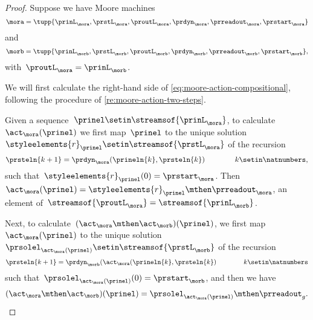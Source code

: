 \begin{proof}
    Suppose we have Moore machines
    \begin{equation}
        \mora = \tupp{\prinL_{\mora},\prstL_{\mora},\proutL_{\mora},\prdyn_{\mora},\prreadout_{\mora},\prstart_{\mora}}
    \end{equation}
    and
    \begin{equation}
        \morb = \tupp{\prinL_{\morb},\prstL_{\morb},\proutL_{\morb},\prdyn_{\morb},\prreadout_{\morb},\prstart_{\morb}},
    \end{equation}
    with~$\proutL_\mora = \prinL_\morb$.

    We will first calculate the right-hand side of \cref{eq:moore-action-compositional}, following the procedure of \cref{re:moore-action-two-steps}.

    Given a sequence~$\prinel \setin \streamsof{\prinL_{\mora}}$, to calculate~$\act_\mora(\prinel)$ we first map~$\prinel$ to the unique solution~$\styleelements{r}_\prinel \setin \streamsof{\prstL_{\mora}}$ of the recursion
    \begin{equation}
        \prsteln{k+1} = \prdyn_\mora(\prineln{k}, \prsteln{k}) \qquad \qquad k \setin \natnumbers,
    \end{equation}
    such that~$\styleelements{r}_\prinel(0) = \prstart_{\mora}$.
    Then~$\act_\mora(\prinel) = \styleelements{r}_\prinel \mthen \prreadout_\mora$, an element of~$\streamsof{\proutL_{\mora}} = \streamsof{\prinL_{\morb}}$.

    Next, to calculate~$(\act_\mora \mthen \act_\morb)(\prinel)$, we first map~$\act_\mora(\prinel)$ to the unique solution~$\prsolel_{\act_\mora(\prinel)} \setin \streamsof{\prstL_{\morb}}$ of the recursion
        \begin{equation}
            \prsteln{k+1} = \prdyn_\morb(\act_\mora(\prineln{k}, \prsteln{k}) \qquad \qquad k \setin \natnumbers
        \end{equation}
        such that~$\prsolel_{\act_\mora(\prinel)}(0) = \prstart_{\morb}$, and then we have
        \begin{equation}
            \label{eq:Moore-act-composition-1}
            (\act_\mora \mthen \act_\morb)(\prinel) = \prsolel_{\act_\mora(\prinel)} \mthen \prreadout_g.
        \end{equation}


\end{proof}
